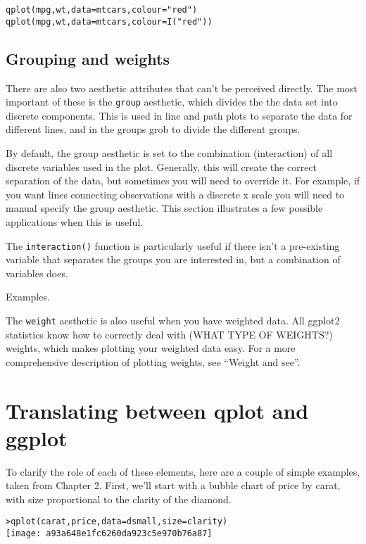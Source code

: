 \begin{alltt}
  qplot(mpg, wt, data=mtcars, colour = "red")
  qplot(mpg, wt, data=mtcars, colour = I("red"))
\end{alltt}


\subsection{Grouping and weights}
\label{sub:grouping}

There are also two aesthetic attributes that can't be perceived directly.  The most important of these is the {\tt group} aesthetic, which divides the the data set into discrete components.   This is used in line and path plots to separate the data for different lines, and in the groups grob to divide the different groups. 

By default, the group aesthetic is set to the combination (interaction) of all discrete variables used in the plot.  Generally, this will create the correct separation of the data, but sometimes you will need to override it.  For example, if you want lines connecting observations with a discrete x scale you will need to manual specify the group aesthetic.  This section illustrates a few possible applications when this is useful.

The {\tt interaction()} function is particularly useful if there isn't a pre-existing variable that separates the groups you are interested in, but a combination of variables does.  

Examples.

The {\tt weight} aesthetic is also useful when you have weighted data.  All ggplot2 statistics know how to correctly deal with (WHAT TYPE OF WEIGHTS?) weights, which makes plotting your weighted data easy.  For a more comprehensive description of plotting weights, see ``Weight and see''.

\section{Translating between qplot and ggplot}
\label{sec:qplot-ggplot}


To clarify the role of each of these elements, here are a couple of simple examples, taken from Chapter 2.  First, we'll start with a bubble chart of price by carat, with size proportional to the clarity of the diamond.

\begin{alltt}
> qplot(carat, price, data = dsmall, size = clarity)
\texttt{[image: a93a648e1fc6260da923c5e970b76a87]}

\end{alltt}

